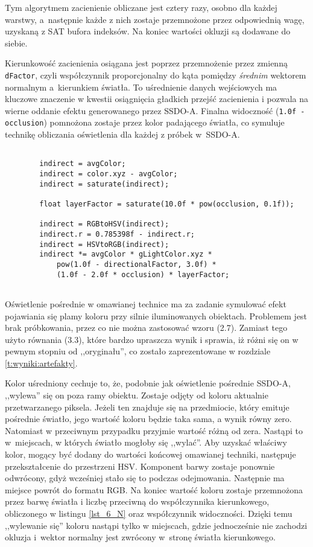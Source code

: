 		Tym algorytmem zacienienie obliczane jest cztery razy, osobno dla każdej warstwy, a~następnie każde z nich zostaje przemnożone przez odpowiednią wagę, uzyskaną z SAT bufora indeksów. Na koniec wartości okluzji są dodawane do siebie.
		
		Kierunkowość zacienienia osiągana jest poprzez przemnożenie przez zmienną \texttt{dFactor}, czyli współczynnik proporcjonalny do kąta pomiędzy \emph{średnim} wektorem normalnym a~kierunkiem światła. To uśrednienie danych wejściowych ma kluczowe znaczenie w kwestii osiągnięcia gładkich przejść zacienienia i pozwala na wierne oddanie efektu generowanego przez SSDO-A. Finalna widoczność (\texttt{1.0f - occlusion}) pomnożona zostaje przez kolor padającego światła, co symuluje technikę obliczania oświetlenia dla każdej z próbek w~SSDO-A.
		
		\begin{lstlisting}[language=HLSL,caption={Obliczenie oświetlenia pośredniego SSDO-B.},label={lst_6_O}]
		
		indirect = avgColor;
		indirect = color.xyz - avgColor;
		indirect = saturate(indirect);
		
		float layerFactor = saturate(10.0f * pow(occlusion, 0.1f));
		
		indirect = RGBtoHSV(indirect);
		indirect.r = 0.785398f - indirect.r;
		indirect = HSVtoRGB(indirect);
		indirect *= avgColor * gLightColor.xyz * 
			pow(1.0f - directionalFactor, 3.0f) * 
			(1.0f - 2.0f * occlusion) * layerFactor;
		
		\end{lstlisting}
		
		Oświetlenie pośrednie w omawianej technice ma za zadanie symulować efekt pojawiania się plamy koloru przy silnie iluminowanych obiektach. Problemem jest brak próbkowania, przez co nie można zastosować wzoru (2.7). Zamiast tego użyto równania (3.3), które bardzo upraszcza wynik i sprawia, iż różni się on w pewnym stopniu od ,,oryginału'', co zostało zaprezentowane w rozdziale \ref{t:wyniki:artefakty}. 
		
		Kolor uśredniony cechuje to, że, podobnie jak oświetlenie pośrednie SSDO-A, ,,wylewa'' się on poza ramy obiektu. Zostaje odjęty od koloru aktualnie przetwarzanego piksela. Jeżeli ten znajduje się na przedmiocie, który emituje pośrednie światło, jego wartość koloru będzie taka sama, a wynik równy zero. Natomiast w przeciwnym przypadku przyjmie wartość różną od zera. Nastąpi to w~miejscach, w których światło mogłoby się ,,wylać''. Aby uzyskać właściwy kolor, mogący być dodany do wartości końcowej omawianej techniki, następuje przekształcenie do przestrzeni HSV. Komponent barwy zostaje ponownie odwrócony, gdyż wcześniej stało się to podczas odejmowania. Następnie ma miejsce powrót do formatu RGB. Na koniec wartość koloru zostaje przemnożona przez barwę światła i liczbę przeciwną do współczynnika kierunkowego, obliczonego w listingu \ref{lst_6_N} oraz współczynnik widoczności. Dzięki temu ,,wylewanie się'' koloru nastąpi tylko w miejscach, gdzie jednocześnie nie zachodzi okluzja i~wektor normalny jest zwrócony w~stronę światła kierunkowego.
		

